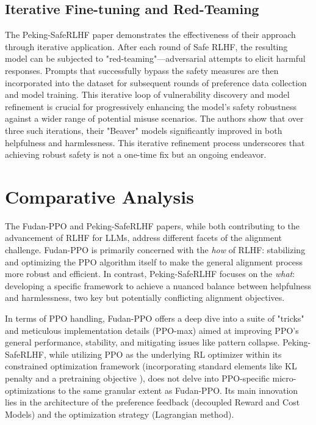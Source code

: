 \documentclass{article}
\begin{document}
\subsection{Iterative Fine-tuning and Red-Teaming}
The Peking-SafeRLHF paper demonstrates the effectiveness of their approach through iterative application. After each round of Safe RLHF, the resulting model can be subjected to "red-teaming"—adversarial attempts to elicit harmful responses. Prompts that successfully bypass the safety measures are then incorporated into the dataset for subsequent rounds of preference data collection and model training. \cite{Dai2023SafeRLHF} This iterative loop of vulnerability discovery and model refinement is crucial for progressively enhancing the model's safety robustness against a wider range of potential misuse scenarios. The authors show that over three such iterations, their "Beaver" models significantly improved in both helpfulness and harmlessness. \cite{Dai2023SafeRLHF} This iterative refinement process underscores that achieving robust safety is not a one-time fix but an ongoing endeavor.

\section{Comparative Analysis}
\label{sec:comparative}

The Fudan-PPO \cite{Zheng2023PPO} and Peking-SafeRLHF \cite{Dai2023SafeRLHF} papers, while both contributing to the advancement of RLHF for LLMs, address different facets of the alignment challenge. Fudan-PPO is primarily concerned with the \textit{how} of RLHF: stabilizing and optimizing the PPO algorithm itself to make the general alignment process more robust and efficient. In contrast, Peking-SafeRLHF focuses on the \textit{what}: developing a specific framework to achieve a nuanced balance between helpfulness and harmlessness, two key but potentially conflicting alignment objectives.

In terms of PPO handling, Fudan-PPO offers a deep dive into a suite of "tricks" and meticulous implementation details (PPO-max) aimed at improving PPO's general performance, stability, and mitigating issues like pattern collapse. Peking-SafeRLHF, while utilizing PPO as the underlying RL optimizer within its constrained optimization framework (incorporating standard elements like KL penalty and a pretraining objective \cite{Dai2023SafeRLHF}), does not delve into PPO-specific micro-optimizations to the same granular extent as Fudan-PPO. Its main innovation lies in the architecture of the preference feedback (decoupled Reward and Cost Models) and the optimization strategy (Lagrangian method).
\end{document}
